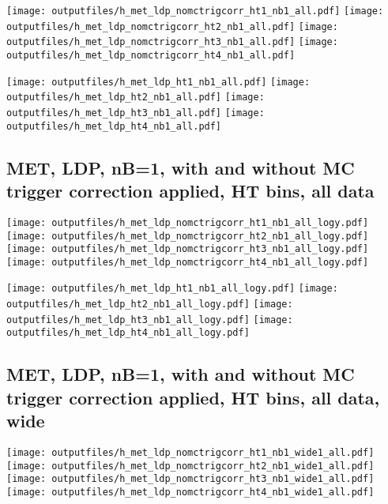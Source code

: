 \documentclass[11pt]{article}
\begin{document}
    \noindent
     \texttt{[image: outputfiles/h\_met\_ldp\_nomctrigcorr\_ht1\_nb1\_all.pdf]}
     \texttt{[image: outputfiles/h\_met\_ldp\_nomctrigcorr\_ht2\_nb1\_all.pdf]}
     \texttt{[image: outputfiles/h\_met\_ldp\_nomctrigcorr\_ht3\_nb1\_all.pdf]}
     \texttt{[image: outputfiles/h\_met\_ldp\_nomctrigcorr\_ht4\_nb1\_all.pdf]}

    \noindent
     \texttt{[image: outputfiles/h\_met\_ldp\_ht1\_nb1\_all.pdf]}
     \texttt{[image: outputfiles/h\_met\_ldp\_ht2\_nb1\_all.pdf]}
     \texttt{[image: outputfiles/h\_met\_ldp\_ht3\_nb1\_all.pdf]}
     \texttt{[image: outputfiles/h\_met\_ldp\_ht4\_nb1\_all.pdf]}

    \clearpage
     \subsection{ MET, LDP, nB=1, with and without MC trigger correction applied, HT bins, all data}

    \noindent
     \texttt{[image: outputfiles/h\_met\_ldp\_nomctrigcorr\_ht1\_nb1\_all\_logy.pdf]}
     \texttt{[image: outputfiles/h\_met\_ldp\_nomctrigcorr\_ht2\_nb1\_all\_logy.pdf]}
     \texttt{[image: outputfiles/h\_met\_ldp\_nomctrigcorr\_ht3\_nb1\_all\_logy.pdf]}
     \texttt{[image: outputfiles/h\_met\_ldp\_nomctrigcorr\_ht4\_nb1\_all\_logy.pdf]}

    \noindent
     \texttt{[image: outputfiles/h\_met\_ldp\_ht1\_nb1\_all\_logy.pdf]}
     \texttt{[image: outputfiles/h\_met\_ldp\_ht2\_nb1\_all\_logy.pdf]}
     \texttt{[image: outputfiles/h\_met\_ldp\_ht3\_nb1\_all\_logy.pdf]}
     \texttt{[image: outputfiles/h\_met\_ldp\_ht4\_nb1\_all\_logy.pdf]}


    \clearpage
     \subsection{ MET, LDP, nB=1, with and without MC trigger correction applied, HT bins, all data, wide}

    \noindent
     \texttt{[image: outputfiles/h\_met\_ldp\_nomctrigcorr\_ht1\_nb1\_wide1\_all.pdf]}
     \texttt{[image: outputfiles/h\_met\_ldp\_nomctrigcorr\_ht2\_nb1\_wide1\_all.pdf]}
     \texttt{[image: outputfiles/h\_met\_ldp\_nomctrigcorr\_ht3\_nb1\_wide1\_all.pdf]}
     \texttt{[image: outputfiles/h\_met\_ldp\_nomctrigcorr\_ht4\_nb1\_wide1\_all.pdf]}
\end{document}
